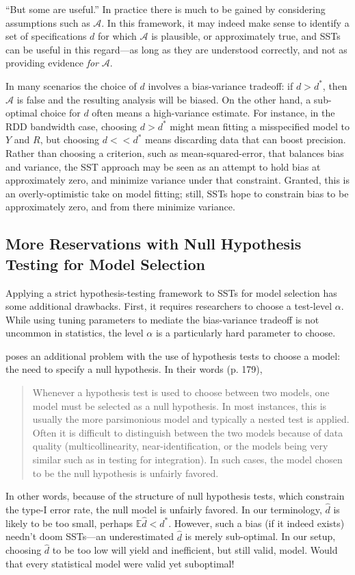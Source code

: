 \documentclass[12pt]{article}\usepackage[]{graphicx}\usepackage[]{color}
\newcommand{\dstar}{d^*}
\newcommand{\EE}{\mathbb{E}}
\begin{document}
``But some are useful.''
In practice there is much to be gained by considering assumptions such
as $\mathcal{A}$.
In this framework, it may indeed make sense to identify a set of
specifications $d$ for which $\mathcal{A}$ is plausible, or
approximately true, and
SSTs can be useful in this regard---as long as they are understood
correctly, and not as providing evidence \emph{for} $\mathcal{A}$.

In many scenarios the choice of $d$ involves a bias-variance tradeoff:
if $d>\dstar$, then $\mathcal{A}$ is false and the resulting analysis
will be biased.
On the other hand, a sub-optimal choice for $d$ often means a
high-variance estimate.
For instance, in the RDD bandwidth case, choosing $d>\dstar$ might mean
fitting a misspecified model to $Y$ and $R$, but choosing $d<<\dstar$
means discarding data that can boost precision.
Rather than choosing a criterion, such as mean-squared-error, that
balances bias and variance, the SST approach may be seen as an attempt to hold
bias at approximately zero, and minimize variance under that
constraint.
Granted, this is an overly-optimistic take on model fitting;
still, SSTs hope to constrain bias to be approximately zero, and from there
minimize variance.


\subsection{More Reservations with Null Hypothesis Testing for Model
  Selection}

Applying a strict hypothesis-testing framework to SSTs for model
selection has some additional drawbacks.
First, it requires researchers to choose a test-level $\alpha$. While
using tuning parameters to mediate the bias-variance tradeoff is not
uncommon in statistics, the level $\alpha$ is a particularly hard
parameter to choose.

\citet{granger} poses an additional problem with the use of
hypothesis tests to choose a model: the need to specify a null
hypothesis. In their words (p. 179),
\begin{quote}
Whenever a hypothesis test is used to choose between two models, one
model must be selected as a null hypothesis. In most instances, this
is usually the more parsimonious model and typically a nested test is
applied. Often it is difficult to distinguish between the two models
because of data quality (multicollinearity, near-identification, or
the models being very similar such as in testing for integration). In
such cases, the model chosen to be the null hypothesis is unfairly
favored.
\end{quote}
In other words, because of the structure of null hypothesis tests,
which constrain the type-I error rate, the null model is unfairly
favored.
In our terminology, $\hat{d}$ is likely to be too small, perhaps $\EE
\hat{d}<\dstar$.
However, such a bias (if it indeed exists) needn't doom SSTs---an
underestimated $\hat{d}$ is merely sub-optimal. In our setup, choosing
$\hat{d}$ to be too low will yield and inefficient, but still valid,
model.
Would that every statistical model were valid yet suboptimal!
\end{document}
